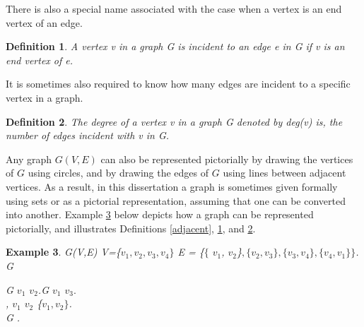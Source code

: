 \documentclass[12pt]{article}
\newtheorem{definition}{Definition}[subsection]
\newtheorem{example}[definition]{Example}
\numberwithin{equation}{subsection}
\numberwithin{table}{subsection}
\numberwithin{algorithm}{subsection}
\numberwithin{figure}{subsection}
\begin{document}
There is also a special name associated with the case when a vertex is an end vertex of an edge.
\begin{definition}
\label{incident}
A vertex v in a graph G is incident to an edge e in G if v is an end vertex of e. {}
\end{definition}
It is sometimes also required to know how many edges are incident to a specific vertex in a graph.
\begin{definition}
\label{degree}
The degree of a vertex v in a graph G denoted by deg(v) is, the number of edges incident with v in G. {}
\end{definition}
Any graph $\mathit{G(V,E)}$ can also be represented pictorially by drawing the vertices of $\mathit{G}$ using circles, and by drawing the edges of $\mathit{G}$ using lines between adjacent vertices. As a result, in this dissertation a graph is sometimes given formally using sets or as a pictorial representation, assuming that one can be converted into another. Example \ref{Example 1} below depicts how a graph can be represented pictorially, and illustrates Definitions  \ref{adjacent}, \ref{incident}, and \ref{degree}.
\begin{example}
\label{Example 1}
{} G(V,E) {}  V=\{$v_1, v_2, v_3, v_4\}$ {} E = \{$\{$ $v_1$, $v_2$\}$, \{v_2,v_3\}, \{v_3,v_4\}, \{v_4,v_1\}\}$.\\{} G {}\\
\begin{center}
\end{center}
{}G {} $v_1$ {} $v_2$.{}G {} $v_1$ {} $v_3.$\\ {}, $v_1$ {} $v_2$ {} \{$v_1, v_2\}$.\\
{} G {}.
\end{example}
\end{document}
